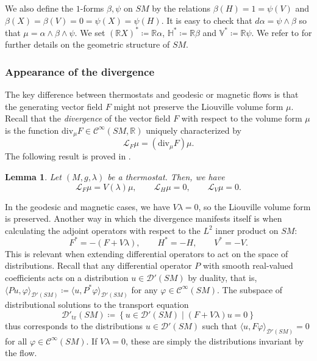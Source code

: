 \documentclass[reqno,12pt,letterpaper]{amsart}
\newtheorem{lemma}[proposition]{Lemma}
\theoremstyle{definition}
\theoremstyle{remark}
\theoremstyle{definition}
\numberwithin{equation}{section}
\newcommand{\R}{\mathbb{R}}
\renewcommand{\div}{\mathrm{div}}
\begin{document}
We also define the $1$-forms $\beta, \psi $ on $SM$ by the relations $\beta(H)=1=\psi(V)$ and $\beta(X)=\beta(V)=0=\psi(X)=\psi(H)$.  It is easy to check that $d\alpha = \psi \wedge\beta$ so that $\mu = \alpha\wedge \beta \wedge\psi$. We set $(\R X)^\ast\coloneqq\R\alpha$, $\mathbb{H}^\ast \coloneqq \R\beta$ and $\mathbb{V}^\ast \coloneqq\R\psi$. 
We refer to \cite[\S 3.5]{paternain23b}  for further details on the geometric structure of $SM$. 

\subsubsection{Appearance of the divergence}
The key difference between thermostats and geodesic or magnetic flows is that the generating vector field $F$ might not preserve the Liouville volume form $\mu$. Recall that the \textit{divergence} of the vector field $F$ with respect to the volume form $\mu$ is the function $\div_\mu F\in \mathcal{C}^\infty(SM, \R)$ uniquely characterized by 
$$\mathcal{L}_F \mu = (\div_\mu F)\mu.$$
 The following result is proved in \cite[Lemma 3.2]{dairbekov07}. 
\begin{lemma}\label{lemma:divergence}
Let $(M, g, \lambda)$ be a thermostat. Then, we have
$$\mathcal{L}_F\mu = V(\lambda)\mu, \qquad \mathcal{L}_H\mu = 0, \qquad \mathcal{L}_V \mu=0.$$
\end{lemma}

In the geodesic and magnetic cases, we have $V\lambda=0$, so the Liouville volume form is preserved. Another way in which the divergence manifests itself is when calculating the adjoint operators with respect to the $L^2$ inner product on $SM$:
$$F^*=-(F+V\lambda),\qquad H^*=-H, \qquad V^*=-V.$$
This is relevant when extending differential operators to act on the space of distributions. Recall that any differential operator $P$ with smooth real-valued coefficients acts on a distribution $u\in \mathcal{D}'(SM)$ by duality, that is, $\langle P u , \varphi\rangle_{\mathcal{D}'(SM)}\coloneqq\langle u, P^* \varphi \rangle_{\mathcal{D}'(SM)}$ for any $\varphi\in \mathcal{C}^\infty(SM)$. The subspace of distributional solutions to the transport equation
\begin{equation*}
\mathcal{D}'_{\text{tr}}(SM)  \coloneqq\left\{u\in \mathcal{D}'(SM) \mid (F+V\lambda)u=0\right\}
\end{equation*}
thus corresponds to the distributions $u\in \mathcal{D}'(SM)$ such that $\langle u , F\varphi\rangle_{\mathcal{D}'(SM)}=0$ for all $\varphi\in \mathcal{C}^\infty(SM)$. If $V\lambda=0$, these are simply the distributions invariant by the flow. 
\end{document}

